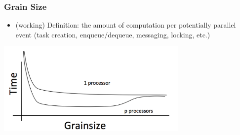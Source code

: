 \begin{frame}
\frametitle{Grain Size}
  \begin{itemize}
    \item (working) Definition: the amount of computation per potentially
      parallel event (task creation, enqueue/dequeue, messaging,
      locking, etc.)
  \end{itemize}
  \begin{center} \includegraphics[width=0.7\textwidth]{../figures/grain1.png} \end{center}
\end{frame}
